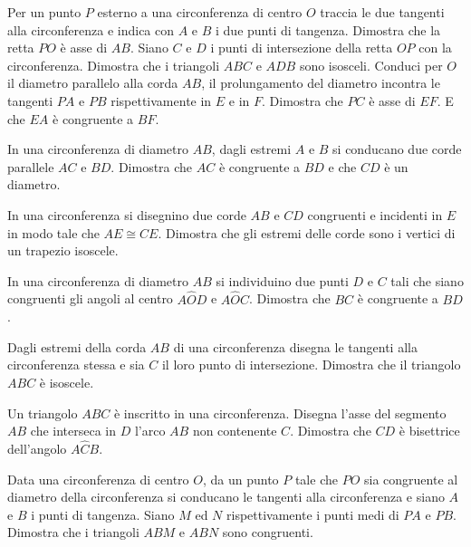 \begin{multicols}{2}
\begin{esercizio}
\label{ese:5.33}
Per un punto $P$ esterno a una circonferenza di centro $O$ traccia le due tangenti alla circonferenza e indica con $A$ e $B$ i due punti di tangenza. Dimostra che la retta $PO$ è asse di $AB$. Siano $C$ e $D$ i punti di intersezione della retta $OP$ con la circonferenza. Dimostra che i triangoli $ABC$ e $ADB$ sono isosceli. Conduci per $O$ il diametro parallelo alla corda $AB$, il prolungamento del diametro incontra le tangenti $PA$ e $PB$ rispettivamente in $E$ e in $F$. Dimostra che $PC$ è asse di $EF$. E che $EA$ è congruente a $BF$.
\end{esercizio}

\begin{esercizio}
\label{ese:5.34}
In una circonferenza di diametro $AB$, dagli estremi $A$ e $B$ si conducano due corde parallele $AC$ e $BD$. Dimostra che $AC$ è congruente a $BD$ e che $CD$ è un diametro.
\end{esercizio}

\begin{esercizio}
\label{ese:5.35}
In una circonferenza si disegnino due corde $AB$ e $CD$ congruenti e incidenti in $E$ in modo tale che $AE\cong CE$. Dimostra che gli estremi delle corde sono i vertici di un trapezio isoscele.
\end{esercizio}

\begin{esercizio}
\label{ese:5.36}
In una circonferenza di diametro $AB$ si individuino due punti $D$ e $C$ tali che siano congruenti gli angoli al centro $A\widehat{O}D$ e $A\widehat{O}C$. Dimostra che $BC$ è congruente a $BD$.
\end{esercizio}

\begin{esercizio}
\label{ese:5.37}
Dagli estremi della corda $AB$ di una circonferenza disegna le tangenti alla circonferenza stessa e sia $C$ il loro punto di intersezione. Dimostra che il triangolo $ABC$ è isoscele.
\end{esercizio}

\begin{esercizio}
\label{ese:5.38}
Un triangolo $ABC$ è inscritto in una circonferenza. Disegna l'asse del segmento $AB$ che interseca in $D$ l'arco $AB$ non contenente $C$. Dimostra che $CD$ è bisettrice dell'angolo $A\widehat{C}B$.
\end{esercizio}

\begin{esercizio}
\label{ese:5.39}
Data una circonferenza di centro $O$, da un punto $P$ tale che $PO$ sia congruente al diametro della circonferenza si conducano le tangenti alla circonferenza e siano $A$ e $B$ i punti di tangenza. Siano $M$ ed $N$ rispettivamente i punti medi di $PA$ e $PB$. Dimostra che i triangoli $ABM$ e $ABN$ sono congruenti.
\end{esercizio}


\end{multicols}
